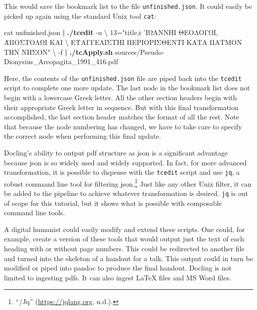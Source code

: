 \documentclass[
  letterpaper,
]{tufte-handout}
\newenvironment{Shaded}{\begin{snugshade}}{\end{snugshade}}
\newcommand{\AttributeTok}[1]{\textcolor[rgb]{0.00,0.34,0.68}{#1}}
\newcommand{\DataTypeTok}[1]{\textcolor[rgb]{0.00,0.34,0.68}{#1}}
\newcommand{\ExtensionTok}[1]{\textcolor[rgb]{0.00,0.58,1.00}{\textbf{#1}}}
\newcommand{\FunctionTok}[1]{\textcolor[rgb]{0.39,0.29,0.61}{#1}}
\newcommand{\KeywordTok}[1]{\textcolor[rgb]{0.12,0.11,0.11}{\textbf{#1}}}
\newcommand{\NormalTok}[1]{\textcolor[rgb]{0.12,0.11,0.11}{#1}}
\newcommand{\StringTok}[1]{\textcolor[rgb]{0.75,0.01,0.01}{#1}}
\begin{document}
This would save the bookmark list to the file \texttt{unfinished.json}.
It could easily be picked up again using the standard Unix tool
\texttt{cat}:

\begin{Shaded}
\begin{Highlighting}[]
\FunctionTok{cat}\NormalTok{ unfinished.json }\KeywordTok{|} \ExtensionTok{./tcedit} \AttributeTok{{-}u} \DataTypeTok{\textbackslash{}}
\NormalTok{13=}\StringTok{"title,ι ᾽ΙΩΑΝΝΗΙ ΘΕΟΛΟΓΩΙ, ΆΠΟΣΤΟΛΩΙ ΚΑΙ }\DataTypeTok{\textbackslash{}}
\StringTok{ΕΥΑΓΓΕΛΙΣΤΗΙ ΠΕΡΙΟΡΙΣΘΕΝΤΙ ΚΑΤΑ ΠΑΤΜΟΝ ΤΗΝ ΝΗΣΟΝ"} \DataTypeTok{\textbackslash{}}
\NormalTok{{-}f }\KeywordTok{|} \ExtensionTok{./tcApply.sh}\NormalTok{ sources/Pseudo{-}Dionysius\_Areopagita\_1991\_416.pdf}
\end{Highlighting}
\end{Shaded}

Here, the contents of the \texttt{unfinished.json} file are piped back
into the \texttt{tcedit} script to complete one more update. The last
node in the bookmark list does not begin with a lowercase Greek letter.
All the other section headers begin with their appropriate Greek letter
in sequence. But with this final transformation accomplished, the last
section header matches the format of all the rest. Note that because the
node numbering has changed, we have to take care to specify the correct
node when performing this final update.

Docling's ability to output pdf structure as json is a significant
advantage because json is so widely used and widely supported. In fact,
for more advanced transformation, it is possible to dispense with the
\texttt{tcedit} script and use \texttt{jq}, a robust command line tool
for filtering json.\footnote{{``/Jq''} (\url{https://jqlang.org}, n.d.).}
Just like any other Unix filter, it can be added to the pipeline to
achieve whatever transformation is desired. \texttt{jq} is out of scope
for this tutorial, but it shows what is possible with composable command
line tools.

A digital humanist could easily modify and extend these scripts. One
could, for example, create a version of these tools that would output
just the text of each heading with or without page numbers. This could
be redirected to another file and turned into the skeleton of a handout
for a talk. This output could in turn be modified or piped into pandoc
to produce the final handout. Docling is not limited to ingesting pdfs.
It can also ingest \LaTeX{} files and MS Word files.
\end{document}
